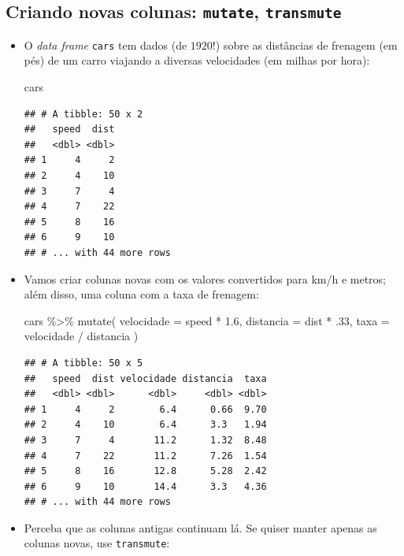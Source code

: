 \documentclass[
  11pt]{report}
\newenvironment{Shaded}{\begin{snugshade}}{\end{snugshade}}
\newcommand{\AttributeTok}[1]{\textcolor[rgb]{0.77,0.63,0.00}{#1}}
\newcommand{\DecValTok}[1]{\textcolor[rgb]{0.00,0.00,0.81}{#1}}
\newcommand{\FloatTok}[1]{\textcolor[rgb]{0.00,0.00,0.81}{#1}}
\newcommand{\FunctionTok}[1]{\textcolor[rgb]{0.00,0.00,0.00}{#1}}
\newcommand{\NormalTok}[1]{#1}
\newcommand{\SpecialCharTok}[1]{\textcolor[rgb]{0.00,0.00,0.00}{#1}}
\renewenvironment{Shaded}{
    \begin{mdframed}[%
      roundcorner=2pt,%
      innerleftmargin=5pt,%
      innerrightmargin=5pt,%
      topline=true,%
      leftline=true,%
      rightline=true,%
      bottomline=true,%
      linewidth=0.5pt,%
      linecolor=black!20,%
      backgroundcolor=black!2,%
      skipabove=2ex,%
      skipbelow=2.5ex%
    ]%
  }
  {
    \end{mdframed}
  }
\begin{document}
\hypertarget{criando-novas-colunas-mutate-transmute}{%
\subsection{\texorpdfstring{Criando novas colunas: \texttt{mutate}, \texttt{transmute}}{Criando novas colunas: mutate, transmute}}\label{criando-novas-colunas-mutate-transmute}}

\begin{itemize}
\item
  O \emph{data frame} \texttt{cars} tem dados (de $1920$!) sobre as distâncias de frenagem (em pés) de um carro viajando a diversas velocidades (em milhas por hora):

\begin{Shaded}
\begin{Highlighting}[]
\NormalTok{cars}
\end{Highlighting}
\end{Shaded}

\begin{verbatim}
## # A tibble: 50 x 2
##   speed  dist
##   <dbl> <dbl>
## 1     4     2
## 2     4    10
## 3     7     4
## 4     7    22
## 5     8    16
## 6     9    10
## # ... with 44 more rows
\end{verbatim}
\item
  Vamos criar colunas novas com os valores convertidos para km/h e metros; além disso, uma coluna com a taxa de frenagem:

\begin{Shaded}
\begin{Highlighting}[]
\NormalTok{cars }\SpecialCharTok{\%\textgreater{}\%} 
  \FunctionTok{mutate}\NormalTok{(}
    \AttributeTok{velocidade =}\NormalTok{ speed }\SpecialCharTok{*} \FloatTok{1.6}\NormalTok{,}
    \AttributeTok{distancia =}\NormalTok{ dist }\SpecialCharTok{*}\NormalTok{ .}\DecValTok{33}\NormalTok{,}
    \AttributeTok{taxa =}\NormalTok{ velocidade }\SpecialCharTok{/}\NormalTok{ distancia}
\NormalTok{  )}
\end{Highlighting}
\end{Shaded}

\begin{verbatim}
## # A tibble: 50 x 5
##   speed  dist velocidade distancia  taxa
##   <dbl> <dbl>      <dbl>     <dbl> <dbl>
## 1     4     2        6.4      0.66  9.70
## 2     4    10        6.4      3.3   1.94
## 3     7     4       11.2      1.32  8.48
## 4     7    22       11.2      7.26  1.54
## 5     8    16       12.8      5.28  2.42
## 6     9    10       14.4      3.3   4.36
## # ... with 44 more rows
\end{verbatim}
\item
  Perceba que as colunas antigas continuam lá. Se quiser manter apenas as colunas novas, use \texttt{transmute}:


\end{itemize}
\end{document}
